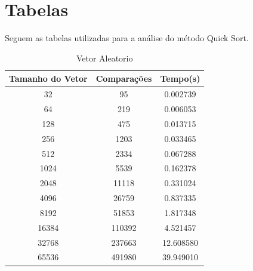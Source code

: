\documentclass[12pt,a4paper,twoside]{report}
\begin{document}
\chapter{Tabelas}

Seguem as tabelas utilizadas para a análise do método Quick Sort.

\begin{table}[h]
  \centering
  \caption{Vetor Aleatorio \label{tab:aleatorio}}
  \begin{tabular}{ccc} \\\hline
  \textbf{Tamanho do Vetor} & \textbf{Comparações} & \textbf{Tempo(s)} \\\hline
  32                        & 95                   & 0.002739          \\\hline
  64                        & 219                  & 0.006053          \\\hline
  128                       & 475                  & 0.013715          \\\hline
  256                       & 1203                 & 0.033465          \\\hline
  512                       & 2334                 & 0.067288          \\\hline
  1024                      & 5539                 & 0.162378          \\\hline
  2048                      & 11118                & 0.331024          \\\hline
  4096                      & 26759                & 0.837335         \\\hline
  8192                      & 51853                & 1.817348        \\\hline
  16384                     & 110392               & 4.521457        \\\hline
  32768                     & 237663               & 12.608580        \\\hline
  65536                     & 491980               & 39.949010        \\\hline
  \end{tabular}
\end{table}
\end{document}
